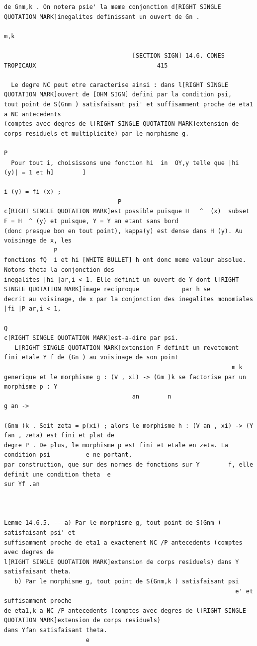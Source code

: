 \documentclass[
  11pt,
]{article}
\begin{document}
\begin{lstlisting}
de Gnm,k . On notera psie' la meme conjonction d[RIGHT SINGLE QUOTATION MARK]inegalites definissant un ouvert de Gn .
                                                                                          m,k

                                    [SECTION SIGN] 14.6. CONES TROPICAUX                                  415

  Le degre NC peut etre caracterise ainsi : dans l[RIGHT SINGLE QUOTATION MARK]ouvert de [OHM SIGN] defini par la condition psi,
tout point de S(Gnm ) satisfaisant psi' et suffisamment proche de eta1 a NC antecedents
(comptes avec degres de l[RIGHT SINGLE QUOTATION MARK]extension de corps residuels et multiplicite) par le morphisme g.
                                                                                            P
  Pour tout i, choisissons une fonction hi  in  OY,y telle que |hi (y)| = 1 et h]        ]
                                                                              i (y) = fi (x) ;
                                P
c[RIGHT SINGLE QUOTATION MARK]est possible puisque H   ^  (x)  subset  F = H  ^ (y) et puisque, Y = Y an etant sans bord
(donc presque bon en tout point), kappa(y) est dense dans H (y). Au voisinage de x, les
              P
fonctions fQ  i et hi [WHITE BULLET] h ont donc meme valeur absolue. Notons theta la conjonction des
inegalites |hi |ar,i < 1. Elle definit un ouvert de Y dont l[RIGHT SINGLE QUOTATION MARK]image reciproque            par h se
decrit au voisinage, de x par la conjonction des inegalites monomiales |fi |P ar,i < 1,
                                                                                  Q
c[RIGHT SINGLE QUOTATION MARK]est-a-dire par psi.
   L[RIGHT SINGLE QUOTATION MARK]extension F definit un revetement fini etale Y f de (Gn ) au voisinage de son point
                                                                m k
generique et le morphisme g : (V , xi) -> (Gm )k se factorise par un morphisme p : Y
                                    an        n                                           g an ->

(Gnm )k . Soit zeta = p(xi) ; alors le morphisme h : (V an , xi) -> (Y  fan , zeta) est fini et plat de
degre P . De plus, le morphisme p est fini et etale en zeta. La condition psi          e ne portant,
par construction, que sur des normes de fonctions sur Y        f, elle definit une condition theta  e
sur Yf .an



Lemme 14.6.5. -- a) Par le morphisme g, tout point de S(Gnm ) satisfaisant psi' et
suffisamment proche de eta1 a exactement NC /P antecedents (comptes avec degres de
l[RIGHT SINGLE QUOTATION MARK]extension de corps residuels) dans Y satisfaisant theta.
   b) Par le morphisme g, tout point de S(Gnm,k ) satisfaisant psi
                                                                 e' et suffisamment proche
de eta1,k a NC /P antecedents (comptes avec degres de l[RIGHT SINGLE QUOTATION MARK]extension de corps residuels)
dans Yfan satisfaisant theta.
                       e


\end{lstlisting}
\end{document}
